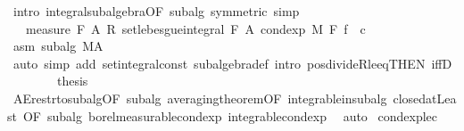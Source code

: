 \begin{isabellebody}
\ {\isacharparenleft}{\kern0pt}intro\ integral{\isacharunderscore}{\kern0pt}subalgebra{}{\isacharbrackleft}{\kern0pt}OF\ subalg{\isacharcomma}{\kern0pt}\ symmetric{\isacharbrackright}{\kern0pt}{\isacharcomma}{\kern0pt}\ simp{\isacharparenright}{\kern0pt}\isanewline
\ \ \ \ \isamarkupfalse%
\ \isamarkupfalse%
\ {\isachardoublequoteopen}{\isacharparenleft}{\kern0pt}{}\ {\isacharslash}{\kern0pt}\ measure\ {\isacharquery}{\kern0pt}F\ A{\isacharparenright}{\kern0pt}\ {\isacharasterisk}{\kern0pt}\isactrlsub R\ set{\isacharunderscore}{\kern0pt}lebesgue{\isacharunderscore}{\kern0pt}integral\ {\isacharquery}{\kern0pt}F\ A\ {\isacharparenleft}{\kern0pt}cond{\isacharunderscore}{\kern0pt}exp\ M\ F\ f{\isacharparenright}{\kern0pt}\ {\isasymin}\ {\isacharbraceleft}{\kern0pt}c{\isachardot}{\kern0pt}{\isachardot}{\kern0pt}{\isacharbraceright}{\kern0pt}{\isachardoublequoteclose}\ \isamarkupfalse%
\ asm\ subalg\ M{\isacharunderscore}{\kern0pt}A\ \isamarkupfalse%
\ {\isacharparenleft}{\kern0pt}auto\ simp\ add{\isacharcolon}{\kern0pt}\ set{\isacharunderscore}{\kern0pt}integral{\isacharunderscore}{\kern0pt}const\ subalgebra{\isacharunderscore}{\kern0pt}def\ intro{\isacharbang}{\kern0pt}{\isacharcolon}{\kern0pt}\ pos{\isacharunderscore}{\kern0pt}divideR{\isacharunderscore}{\kern0pt}le{\isacharunderscore}{\kern0pt}eq{\isacharbrackleft}{\kern0pt}THEN\ iffD{}{\isacharbrackright}{\kern0pt}{\isacharparenright}{\kern0pt}\ \isanewline
\ \ \isacommand{{\isacharbraceright}{\kern0pt}}\isamarkupfalse%
\isanewline
\ \ \isamarkupfalse%
\ {\isacharquery}{\kern0pt}thesis\ \isamarkupfalse%
\ AE{\isacharunderscore}{\kern0pt}restr{\isacharunderscore}{\kern0pt}to{\isacharunderscore}{\kern0pt}subalg{\isacharbrackleft}{\kern0pt}OF\ subalg{\isacharbrackright}{\kern0pt}\ averaging{\isacharunderscore}{\kern0pt}theorem{\isacharbrackleft}{\kern0pt}OF\ integrable{\isacharunderscore}{\kern0pt}in{\isacharunderscore}{\kern0pt}subalg\ closed{\isacharunderscore}{\kern0pt}atLeast{\isacharcomma}{\kern0pt}\ OF\ subalg\ borel{\isacharunderscore}{\kern0pt}measurable{\isacharunderscore}{\kern0pt}cond{\isacharunderscore}{\kern0pt}exp\ integrable{\isacharunderscore}{\kern0pt}cond{\isacharunderscore}{\kern0pt}exp{\isacharbrackright}{\kern0pt}\ \isamarkupfalse%
\ auto\isanewline
{}\isamarkupfalse%
%
\endisatagproof
{\isafoldproof}%
%
\isadelimproof
\isanewline
%
\endisadelimproof
\isanewline
{}\isamarkupfalse%
\ cond{\isacharunderscore}{\kern0pt}exp{\isacharunderscore}{\kern0pt}le{\isacharunderscore}{\kern0pt}c{\isacharcolon}{\kern0pt}\isanewline

\end{isabellebody}
